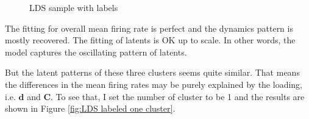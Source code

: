 \documentclass[]{article}
\begin{document}
\begin{figure}[h!]
	\caption{LDS sample with labels}
	\label{fig:LDS labeled}
\end{figure}

The fitting for overall mean firing rate is perfect and the dynamics pattern is mostly recovered. The fitting of latents is OK up to scale. In other words, the model captures the oscillating pattern of latents.

But the latent patterns of these three clusters seems quite similar. That means the differences in the mean firing rates may be purely explained by the loading, i.e. \(\mathbf{d}\) and \(\mathbf{C}\). To see that, I set the number of cluster to be 1 and the results are shown in Figure \ref{fig:LDS labeled one cluster}.
\end{document}
